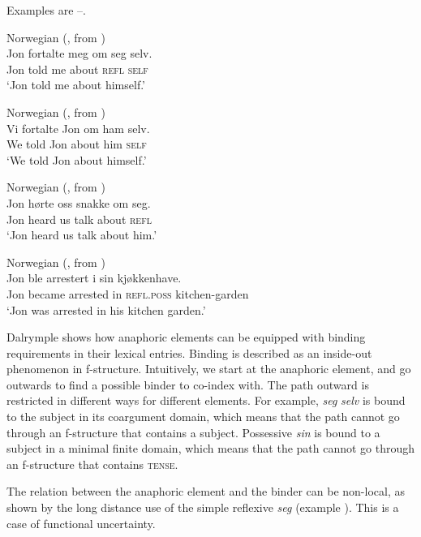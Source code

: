 \documentclass[output=paper,hidelinks]{langscibook}
\begin{document}
Examples are --.



\ea\label{ex:Scandinavian:107} Norwegian (\citealt[29]{dalrymple1993}, from \citealt[67]{Hellan88})\\
\gll
 {Jon} {fortalte} {meg} {om} {seg} {selv.}\\
 Jon told me about \textsc{refl} \textsc{self}\\
\glt `Jon told me about himself.'\z



\ea\label{ex:Scandinavian:108} Norwegian (\citealt[29]{dalrymple1993}, from \citealt[104]{Hellan88})\\
\gll
 {Vi} {fortalte} {Jon} {om} {ham} {selv.}\\
We told Jon about him \textsc{self}\\
\glt `We told Jon about himself.' \z


\ea\label{ex:Scandinavian:109} Norwegian (\citealt[31]{dalrymple1993}, from \citealt[73]{Hellan88})\\
\gll
 {Jon} {hørte} {oss} {snakke} {om} {seg.}\\
 Jon heard us talk about \textsc{refl} \\
\glt `Jon heard us talk about him.'\z

\newpage


\ea\label{ex:Scandinavian:110} Norwegian (\citealt[33]{dalrymple1993}, from \citealt[75]{Hellan88})\\
\gll
 {Jon} {ble} {arrestert} {i} {sin} {kjøkkenhave.}\\
 Jon became arrested in \textsc{refl.poss} kitchen-garden\\
\glt `Jon was arrested in his kitchen garden.'
\z

\noindent Dalrymple shows how anaphoric elements can be equipped with binding requirements in their lexical entries. Binding is described as an inside-out phenomenon in f-structure. Intuitively, we start at the anaphoric element, and go outwards to find a possible binder to co-index with. The path outward is restricted in different ways for different elements. For example, \textit{seg} \textit{selv} is bound to the subject in its coargument domain, which means that the path cannot go through an f-structure that contains a subject. Possessive \textit{sin} is bound to a subject in a minimal finite domain, which means that the path cannot go through an f-structure that contains \textsc{tense}.

 The relation between the anaphoric element and the binder can be non-local, as shown by the long distance use of the simple reflexive \textit{seg} (example ). This is a case of functional uncertainty.
\end{document}
